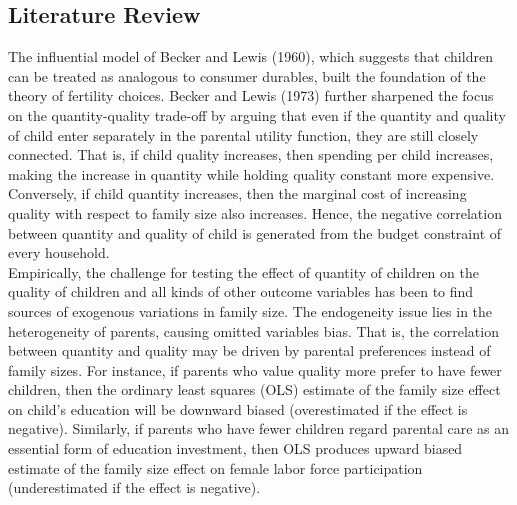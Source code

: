 \documentclass[12pt]{extarticle}
\begin{document}
\subsection{Literature Review}
The influential model of Becker and Lewis (1960), which suggests that children can be treated as analogous to consumer durables, built the foundation of the theory of fertility choices. Becker and Lewis (1973) further sharpened the focus on the quantity-quality trade-off by arguing that even if the quantity and quality of child enter separately in the parental utility function, they are still closely connected. That is, if child quality increases, then spending per child increases, making the increase in quantity while holding quality constant more expensive. Conversely, if child quantity increases, then the marginal cost of increasing quality with respect to family size also increases. Hence, the negative correlation between quantity and quality of child is generated from the budget constraint of every household. \\
\indent Empirically, the challenge for testing the effect of quantity of children on the quality of children and all kinds of other outcome variables has been to find sources of exogenous variations in family size. The endogeneity issue lies in the heterogeneity of parents, causing omitted variables bias. That is, the correlation between quantity and quality may be driven by parental preferences instead of family sizes. For instance, if parents who value quality more prefer to have fewer children, then the ordinary least squares (OLS) estimate of the family size effect on child's education will be downward biased (overestimated if the effect is negative). Similarly, if parents who have fewer children regard parental care as an essential form of education investment, then OLS produces upward biased estimate of the family size effect on female labor force participation (underestimated if the effect is negative). \\
\end{document}
